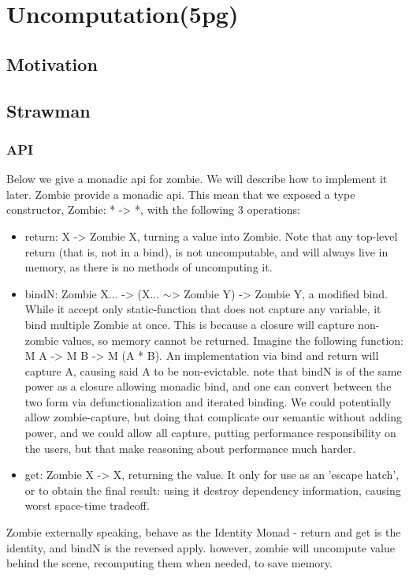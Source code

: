 \section{Uncomputation(5pg)}
\subsection{Motivation}
\subsection{Strawman}
\subsubsection{API}
Below we give a monadic api for zombie. We will describe how to implement it later. 
Zombie provide a monadic api. This mean that we exposed a type constructor, Zombie: * -> *,
with the following 3 operations:

\begin{itemize}
	\item return: X -> Zombie X, turning a value into Zombie. Note that any top-level return (that is, not in a bind), is not uncomputable, and will always live in memory, as there is no methods of uncomputing it.
	\item bindN: Zombie X... -> (X... $\sim$> Zombie Y) -> Zombie Y, a modified bind. While it accept only static-function that does not capture any variable, it bind multiple Zombie at once. This is because a closure will capture non-zombie values, so memory cannot be returned. Imagine the following function: M A -> M B -> M (A * B). An implementation via bind and return will capture A, causing said A to be non-evictable. note that bindN is of the same power as a closure allowing monadic bind, and one can convert between the two form via defunctionalization and iterated binding. We could potentially allow zombie-capture, but doing that complicate our semantic without adding power, and we could allow all capture, putting performance responsibility on the users, but that make reasoning about performance much harder. 
	\item get: Zombie X -> X, returning the value. It only for use as an 'escape hatch', or to obtain the final result: using it destroy dependency information, causing worst space-time tradeoff.
\end{itemize}
Zombie externally speaking, behave as the Identity Monad - return and get is the identity, and bindN is the reversed apply. however, zombie will uncompute value behind the scene, recomputing them when needed, to save memory.

